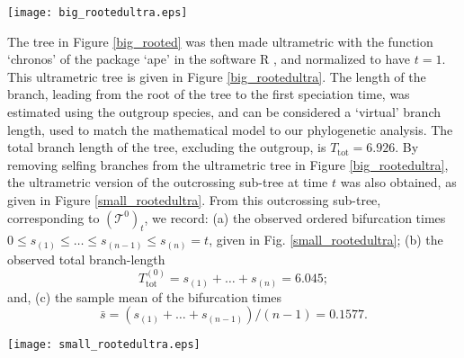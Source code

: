 \documentclass[a4paper,11pt]{article}
\theoremstyle{plain}
\theoremstyle{definition}
\numberwithin{equation}{section}
\begin{document}
\begin{figure*}[t!]
\centerline{\texttt{[image: big\_rootedultra.eps]}} 
\caption{Ultrametric phylogenetic tree consisting of $47$ species in the Geraniaceae family and the outgroup. Outcrosser 
branches are colored blue; the selfer branches, from bifurcation time onward,
are given in red; the outgroup branch is colored in green, and the
`virtual' outcrosser branch in black. The numbers on each branch represent the branch length.}
\label{big_rootedultra}  
\end{figure*}

The tree in Figure \ref{big_rooted} was then made ultrametric with 
the function `chronos' of the package `ape' 
\cite{paradis_etal} in the software R \cite{R}, 
and normalized to have $t=1$. This ultrametric tree is given in
Figure \ref{big_rootedultra}. The length of the branch, leading 
from the root of the tree to the first speciation time, was estimated 
using the outgroup species, and can be considered a `virtual' branch length, 
used to match the mathematical model to our phylogenetic analysis. 
The total branch length of the tree, excluding the outgroup, is $T_\mathrm{tot}=6.926$. 
By removing selfing branches from the ultrametric tree in Figure
\ref{big_rootedultra}, the ultrametric version of the outcrossing
sub-tree at time $t$ was also obtained, as given in Figure
\ref{small_rootedultra}. From this outcrossing sub-tree, 
corresponding to $(\mathcal T^0)_t$, we record: (a)
the observed ordered bifurcation times $0\le s_{(1)}\le\dots \le
s_{(n-1)}\le s_{(n)}=t$, given in Fig. \ref{small_rootedultra}; 
(b) the observed total branch-length 
\[
T^{(0)}_\mathrm{tot}=s_{(1)}+\dots+s_{(n)}=6.045; 
\] 
and, (c) the sample mean of the bifurcation times
\[
\bar s=(s_{(1)}+\dots +s_{(n-1)})/(n-1)=0.1577.
\] 

\begin{figure*}[!t]
\centerline{\texttt{[image: small\_rootedultra.eps]}} 
\caption{Ultrametric outcrosser tree consisting of $33$ species 
in the Geraniaceae family and the outgroup. Outcrosser branches 
are in blue, the outgroup branch in green, and the virtual outcrosser branch is colored black. 
The number given on each branch represents the branch's length.}
\label{small_rootedultra} 
\end{figure*}
\end{document}
